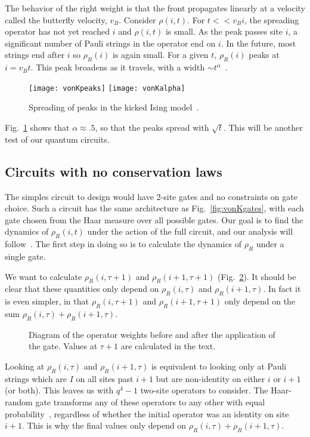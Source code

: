 \documentclass[a4paper,11pt]{article}
\renewcommand{\t}{\tau}
\begin{document}
The behavior of the right weight is that the front propagates linearly at a velocity called the butterfly velocity, $v_B$. Consider $\rho(i,t)$. For $t<<v_B i$, the spreading operator has not yet reached $i$ and $\rho(i,t)$ is small. As the peak passes site $i$, a significant number of Pauli strings in the operator end on $i$. In the future, most strings end after $i$ so $\rho_R(i)$ is again small. For a given $t$, $\rho_R(i)$ peaks at $i=v_B t$. This peak broadens as it travels, with a width $\sim t^\alpha$~\cite{vonKeyserlingkHydro}.
\begin{figure}
	\centering
	\texttt{[image: vonKpeaks]}
	\texttt{[image: vonKalpha]}
	\caption{Spreading of peaks in the kicked Ising model~\cite{vonKeyserlingkHydro}.}
	\label{fig:vonKalpha}
\end{figure}
Fig.~\ref{fig:vonKalpha} shows that $\alpha\approx .5$, so that the peaks spread with $\sqrt{t}$. This will be another test of our quantum circuits.

\subsection{Circuits with no conservation laws} \label{sub:cncons}

The simples circuit to design would have 2-site gates and no constraints on gate choice. Such a circuit has the same architecture as Fig.~\ref{fig:vonKgates}, with each gate chosen from the Haar measure over all possible gates. Our goal is to find the dynamics of $\rho_R(i,t)$ under the action of the full circuit, and our analysis will follow~\cite{vonKeyserlingkHydro}. The first step in doing so is to calculate the dynamics of $\rho_R$ under a single gate. 

We want to calculate $\rho_R(i,\tau+1)$ and $\rho_R(i+1, \tau+1)$ (Fig.~\ref{fig:2sites}). It should be clear that these quantities only depend on $\rho_R(i,\tau)$ and $\rho_R(i+1, \tau)$. In fact it is even simpler, in that $\rho_R(i,\tau+1)$ and $\rho_R(i+1, \tau+1)$ only depend on the sum $\rho_R(i,\tau) + \rho_R(i+1, \tau)$. 

\begin{figure}
	\centering
	
	\caption{Diagram of the operator weights before and after the application of the gate. Values at $\t+1$ are calculated in the text.}
	\label{fig:2sites}
\end{figure}

Looking at $\rho_R(i,\tau)$ and $\rho_R(i+1, \tau)$ is equivalent to looking only at Pauli strings which are $I$ on all sites past $i+1$ but are non-identity on either $i$ or $i+1$ (or both).
This leaves us with $q^4-1$ two-site operators to consider. The Haar-random gate transforms any of these operators to any other with equal probability~\cite{BrownScrambling}, regardless of whether the initial operator was an identity on site $i+1$. This is why the final values only depend on $\rho_R(i,\tau) + \rho_R(i+1, \tau)$.
\end{document}
